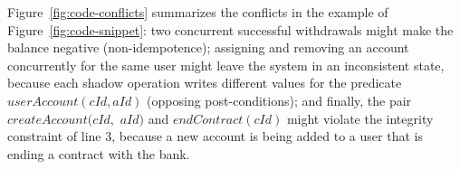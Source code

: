 Figure~\ref{fig:code-conflicts} summarizes the conflicts in the example
of Figure~\ref{fig:code-snippet}:
two concurrent successful withdrawals might make the balance negative
(non-idempotence);
assigning and removing an account concurrently for the same user might leave
the system in an inconsistent state, because each shadow operation writes different
values for the predicate $userAccount(cId, aId)$ (opposing post-conditions);
and finally, the pair $createAccount(cId,$ $ aId)$ and $endContract(cId)$ might
violate the integrity constraint of line 3, because a new account is being
added to a user that is ending a contract with the bank.




